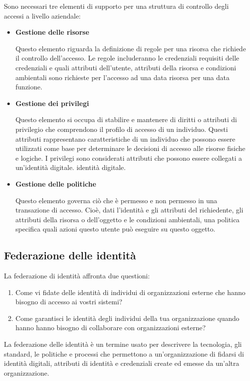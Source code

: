 \singlespacing

Sono necessari tre elementi di supporto per una struttura di controllo degli accessi a livello aziendale:
\begin{itemize}
    \item \textbf{Gestione delle risorse}
    
Questo elemento riguarda la definizione di regole per una risorsa che richiede il controllo dell'accesso. Le regole includeranno le credenziali requisiti delle credenziali e quali attributi dell'utente, attributi della risorsa e condizioni ambientali sono richieste per l'accesso ad una data risorsa per una data funzione.

\item \textbf{Gestione dei privilegi}

Questo elemento si occupa di stabilire e mantenere di diritti o attributi di privilegio che comprendono il profilo di accesso di un individuo. Questi attributi rappresentano caratteristiche di un individuo che possono essere utilizzati come base per determinare le decisioni di accesso alle risorse fisiche e logiche. I privilegi sono considerati attributi che possono essere collegati a un'identità digitale. identità digitale.

\item \textbf{Gestione delle politiche}

Questo elemento governa ciò che è permesso e non permesso in una transazione di accesso. Cioè, dati l'identità e gli attributi del richiedente, gli attributi della risorsa o dell'oggetto e le condizioni ambientali, una politica specifica quali azioni questo utente può eseguire su questo oggetto.
\end{itemize}

\newpage
\subsection{Federazione delle identità}

La federazione di identità affronta due questioni:

\begin{enumerate}
    \item Come vi fidate delle identità di individui di organizzazioni esterne che hanno bisogno di accesso ai vostri sistemi?
    
    \item Come garantisci le identità degli individui della tua organizzazione quando hanno hanno bisogno di collaborare con organizzazioni esterne?
\end{enumerate}
La federazione delle identità è un termine usato per descrivere la tecnologia, gli standard, le politiche e processi che permettono a un'organizzazione di fidarsi di identità digitali, attributi di identità e credenziali create ed emesse da un'altra organizzazione.

